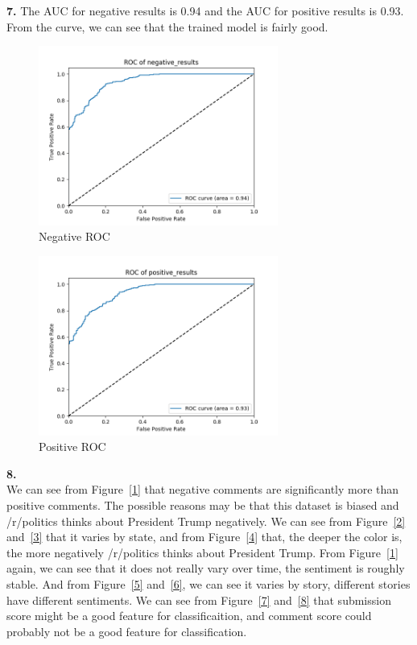 \documentclass{article}
\begin{document}
\textbf{7.} The AUC for negative results is 0.94 and the AUC for positive results is 0.93. From the curve, we can see that the trained model is fairly good.
\begin{figure}[H]
\centering
\includegraphics[width=0.7\textwidth]{8.png}
\caption{Negative ROC}\label{9}
\end{figure}
\begin{figure}[H]
\centering
\includegraphics[width=0.7\textwidth]{9.png}
\caption{Positive ROC}\label{10}
\end{figure}


\textbf{8.}\\

We can see from Figure~\ref{1} that negative comments are significantly more than positive comments. The possible reasons may be that this dataset is biased and /r/politics thinks about President Trump negatively. We can see from Figure~\ref{2} and~\ref{3} that it varies by state, and from Figure~\ref{4} that, the deeper the color is, the more negatively /r/politics thinks about President Trump. From Figure~\ref{1} again, we can see that it does not really vary over time, the sentiment is roughly stable. And from Figure~\ref{5} and~\ref{6}, we can see it varies by story, different stories have different sentiments. We can see from Figure~\ref{7} and~\ref{8} that submission score might be a good feature for classificaition, and comment score could probably not be a good feature for classification.\\
\end{document}

